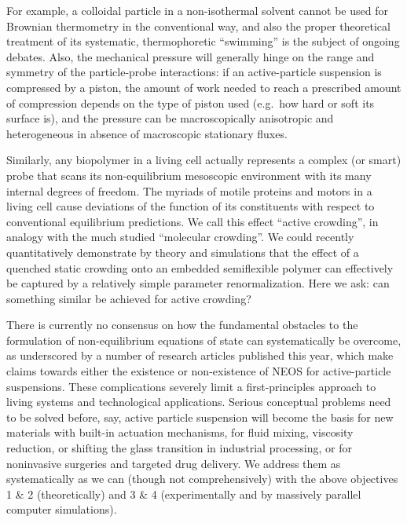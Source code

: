 \begin{workpackage}[id=WPactive,wphases=0-48,
  short=Active Particle Suspensions,%
  title=Probing Active Particle Suspensions with Colloids and Polymers,
  lead=Leipzig,
  LeipzigRM=12]
\begin{wpdescription}
For example, a colloidal particle in a non-isothermal solvent cannot be used for Brownian thermometry in the conventional way, and also the proper theoretical treatment of its systematic, thermophoretic ``swimming'' is the subject of ongoing debates.
%
Also, the mechanical pressure will generally hinge on the range and symmetry of the
particle-probe interactions: if an active-particle suspension is compressed by a piston, the
amount of work needed to reach a prescribed amount of compression depends on the type of
piston used (e.g.\ how hard or soft its surface is), and the pressure can be macroscopically
anisotropic and heterogeneous in absence of macroscopic stationary fluxes.

Similarly, any biopolymer in a living cell actually represents a complex (or smart) probe
that scans its non-equilibrium mesoscopic environment with its many internal degrees of
freedom.
%
The myriads of motile proteins and motors in a living cell cause deviations of the function
of its constituents with respect to conventional equilibrium predictions.  We call this
effect ``active crowding'', in analogy with the much studied ``molecular crowding''.
%
We could recently quantitatively demonstrate by theory and simulations that the effect of a
quenched static crowding onto an embedded semiflexible polymer can effectively be captured
by a relatively simple parameter renormalization.  Here we ask: can something similar be
achieved for active crowding?

There is currently no consensus on how the fundamental obstacles to the formulation of
non-equilibrium equations of state can systematically be overcome, as underscored by a
number of research articles published this year, which make claims towards either the
existence or non-existence of NEOS for active-particle suspensions.
%
These complications severely limit a first-principles approach to living systems and
technological applications.
%
Serious conceptual problems need to be solved before, say, active particle suspension will
become the basis for new materials with built-in actuation mechanisms, for fluid mixing,
viscosity reduction, or shifting the glass transition in industrial processing, or for
noninvasive surgeries and targeted drug delivery.
%
We address them as systematically as we can (though not comprehensively) with the above
objectives 1 \& 2 (theoretically) and 3 \& 4 (experimentally and by massively parallel
computer simulations).

\end{wpdescription}


\end{workpackage}

